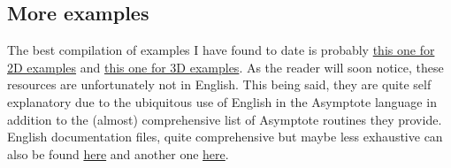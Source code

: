 \documentclass{report}
\begin{document}
\subsection{More examples}
The best compilation of examples I have found to date is probably \href{https://drive.google.com/file/d/0Bzf79yzZcPJJc0dWTHNZMkhqTGc/view?usp=sharing}{this one for 2D examples} and
\href{https://drive.google.com/file/d/0Bzf79yzZcPJJYld2cnhqWXZNU28/view?usp=sharing}{ this one for 3D examples}. As the reader will soon notice, these resources are unfortunately not in English. This being said, they are quite self explanatory due to the ubiquitous use of English in the Asymptote language in addition to the (almost) comprehensive list of Asymptote routines they provide. English documentation files, quite comprehensive but maybe less exhaustive can also be found \href{http://asymptote.sourceforge.net/asymptote.pdf}{here} and another one \href{https://math.uchicago.edu/~cstaats/Charles_Staats_III/Notes_and_papers_files/asymptote_tutorial.pdf}{here}.
\end{document}

